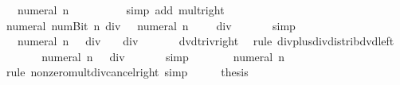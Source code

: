 \begin{isabellebody}
\ {\isachardoublequoteopen}{\isasymdots}\ {\isacharequal}{\kern0pt}\ numeral\ n\ {\isacharasterisk}{\kern0pt}\ {}\ {\isacharplus}{\kern0pt}\ {}{\isachardoublequoteclose}\isanewline
\ \ \ \ \isamarkupfalse%
\ {\isacharparenleft}{\kern0pt}simp\ add{\isacharcolon}{\kern0pt}\ mult{\isacharunderscore}{\kern0pt}{}{\isacharunderscore}{\kern0pt}right{\isacharparenright}{\kern0pt}\isanewline
\ \ \isamarkupfalse%
\ \isamarkupfalse%
\ {\isachardoublequoteopen}numeral\ {\isacharparenleft}{\kern0pt}num{\isachardot}{\kern0pt}Bit{}\ n{\isacharparenright}{\kern0pt}\ div\ {}\ {\isacharequal}{\kern0pt}\ {\isacharparenleft}{\kern0pt}numeral\ n\ {\isacharasterisk}{\kern0pt}\ {}\ {\isacharplus}{\kern0pt}\ {}{\isacharparenright}{\kern0pt}\ div\ {}{\isachardoublequoteclose}\isanewline
\ \ \ \ \isamarkupfalse%
\ simp\isanewline
\ \ \isamarkupfalse%
\ \isamarkupfalse%
\ {\isachardoublequoteopen}{\isasymdots}\ {\isacharequal}{\kern0pt}\ numeral\ n\ {\isacharasterisk}{\kern0pt}\ {}\ div\ {}\ {\isacharplus}{\kern0pt}\ {}\ div\ {}{\isachardoublequoteclose}\isanewline
\ \ \ \ \isamarkupfalse%
\ dvd{\isacharunderscore}{\kern0pt}triv{\isacharunderscore}{\kern0pt}right\ \isamarkupfalse%
\ {\isacharparenleft}{\kern0pt}rule\ div{\isacharunderscore}{\kern0pt}plus{\isacharunderscore}{\kern0pt}div{\isacharunderscore}{\kern0pt}distrib{\isacharunderscore}{\kern0pt}dvd{\isacharunderscore}{\kern0pt}left{\isacharparenright}{\kern0pt}\isanewline
\ \ \isamarkupfalse%
\ \isamarkupfalse%
\ {\isachardoublequoteopen}{\isasymdots}\ {\isacharequal}{\kern0pt}\ numeral\ n\ {\isacharasterisk}{\kern0pt}\ {}\ div\ {}{\isachardoublequoteclose}\isanewline
\ \ \ \ \isamarkupfalse%
\ simp\isanewline
\ \ \isamarkupfalse%
\ \isamarkupfalse%
\ {\isachardoublequoteopen}{\isasymdots}\ {\isacharequal}{\kern0pt}\ numeral\ n{\isachardoublequoteclose}\isanewline
\ \ \ \ \isamarkupfalse%
\ {\isacharparenleft}{\kern0pt}rule\ nonzero{\isacharunderscore}{\kern0pt}mult{\isacharunderscore}{\kern0pt}div{\isacharunderscore}{\kern0pt}cancel{\isacharunderscore}{\kern0pt}right{\isacharparenright}{\kern0pt}\ simp\isanewline
\ \ \isamarkupfalse%
\ \isamarkupfalse%
\ {\isacharquery}{\kern0pt}thesis\ \isacommand{{\isachardot}{\kern0pt}}\isamarkupfalse%

\end{isabellebody}
